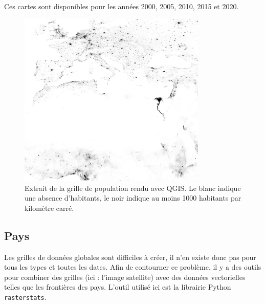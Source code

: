 \documentclass[a4paper, 11pt]{report}
\begin{document}
Ces cartes sont disponibles pour les années 2000, 2005, 2010, 2015 et 2020.

\begin{figure}[h]
	\centering
	\includegraphics[width=0.8\textwidth]{img/pop_subset.png}
	\caption{Extrait de la grille de population \cite{sedac} rendu avec QGIS. Le blanc indique une absence d'habitants, le noir indique au moins 1000 habitants par kilomètre carré.}
	\label{qgis-sedac}
\end{figure}


\subsection{Pays}
Les grilles de données globales sont difficiles à créer, il n'en existe donc pas pour tous les types et toutes les dates. Afin de contourner ce problème, il y a des outils pour combiner des grilles (ici : l'image satellite) avec des données vectorielles telles que les frontières des pays. L'outil utilisé ici est la librairie Python \texttt{rasterstats}.
\end{document}
